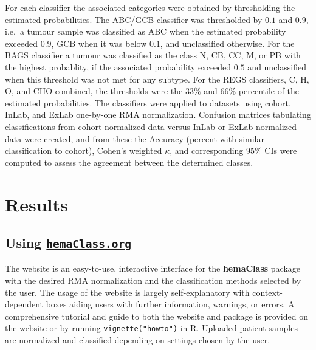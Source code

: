 \documentclass[10pt,letterpaper]{article}
\newcommand{\hemaClass}{\href{http://hemaClass.org}{\texttt{hemaClass.org}}}
\newcommand{\R}{\textsf{R}}
\newcommand{\pkg}[1]{\textbf{#1}}
\begin{document}
For each classifier the associated categories were obtained by thresholding the estimated probabilities.
The ABC/GCB classifier was thresholded by $0.1$ and $0.9$, i.e.\ a tumour sample was classified as ABC when the estimated probability exceeded $0.9$, GCB when it was below $0.1$, and unclassified otherwise.
For the BAGS classifier a tumour was classified as the class N, CB, CC, M, or PB with the highest probablity, if the associated probability exceeded $0.5$ and unclassified when this threshold was not met for any subtype.
For the REGS classifiers, C, H, O, and CHO combined, the thresholds were the $33\%$ and $66\%$ percentile of the estimated probabilities.
The classifiers were applied to datasets using cohort, InLab, and ExLab one-by-one RMA normalization.
Confusion matrices tabulating classifications from cohort normalized data versus InLab or ExLab normalized data were created, and from these the Accuracy (percent with similar classification to cohort), Cohen's weighted $\kappa$, and corresponding $95\%$ CIs were computed to assess the agreement between the determined classes.

\section*{Results}
\subsection*{Using \hemaClass{}}
The website is an easy-to-use, interactive interface for the \pkg{hemaClass} package with the desired RMA normalization and the classification methods selected by the user.
The usage of the website is largely self-explanatory with context-dependent boxes aiding users with further information, warnings, or errors.
A comprehensive tutorial and guide to both the website and package is provided on the website or by running \texttt{vignette("howto")} in \R{}. Uploaded patient samples are normalized and classified depending on settings chosen by the user.
\end{document}
